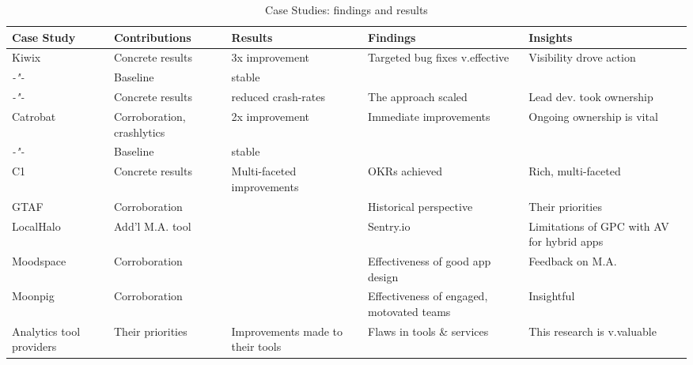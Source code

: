 \begin{landscape} %
\begin{table}
    \centering
    \tabcolsep=0.06cm
    \tiny
    \begin{tabular}{lllll}\toprule
    Case Study                  &Contributions    &Results               &Findings             &Insights  \\
    \midrule
    Kiwix                       &Concrete results &3x improvement        &Targeted bug fixes v.effective &Visibility drove action \\ 
     \textit{-"-}               &Baseline         &stable                &                     & \\
     \textit{-"-}               &Concrete results &reduced crash-rates   &The approach scaled  &Lead dev. took ownership \\
     \midrule
    Catrobat                    &Corroboration, crashlytics &2x improvement     &Immediate improvements &Ongoing ownership is vital \\
     \textit{-"-}               &Baseline         &stable                &                     & \\
     \midrule
    C1                          &Concrete results &Multi-faceted improvements &OKRs achieved & Rich, multi-faceted \\
    GTAF                        &Corroboration    &                      &Historical perspective &Their priorities  \\
    LocalHalo                   &Add'l M.A. tool  &                      &Sentry.io &Limitations of GPC with AV for hybrid apps \\
    Moodspace                   &Corroboration    &                      &Effectiveness of good app design &Feedback on M.A. \\
    Moonpig                     &Corroboration    &                      &Effectiveness of engaged, motovated teams &Insightful \\
    Analytics tool providers    &Their priorities &Improvements made to their tools & Flaws in tools \& services &This research is v.valuable \\
    \bottomrule
    \end{tabular}
    \caption{Case Studies: findings and results}
    \label{tab:empirical-studies-findings-and-results}
\end{table}
\end{landscape}


